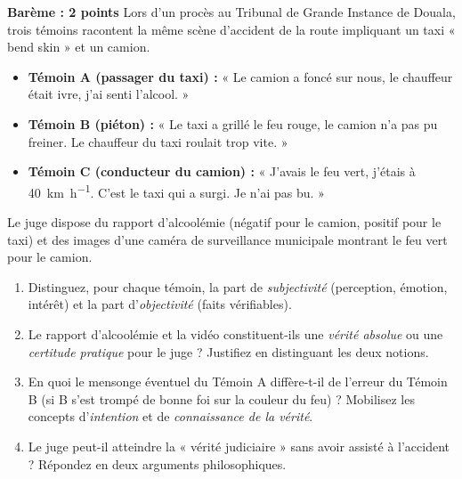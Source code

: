 \documentclass[11pt]{article}
\begin{document}
\begin{exercice}
\textbf{Barème : 2 points}
Lors d'un procès au Tribunal de Grande Instance de Douala, trois témoins racontent la même scène d'accident de la route impliquant un taxi « bend skin » et un camion.

\begin{itemize}
    \item \textbf{Témoin A (passager du taxi) :} « Le camion a foncé sur nous, le chauffeur était ivre, j'ai senti l'alcool. »
    \item \textbf{Témoin B (piéton) :} « Le taxi a grillé le feu rouge, le camion n'a pas pu freiner. Le chauffeur du taxi roulait trop vite. »
    \item \textbf{Témoin C (conducteur du camion) :} « J'avais le feu vert, j'étais à \SI{40}{\kilo\meter\per\hour}. C'est le taxi qui a surgi. Je n'ai pas bu. »
\end{itemize}
Le juge dispose du rapport d'alcoolémie (négatif pour le camion, positif pour le taxi) et des images d'une caméra de surveillance municipale montrant le feu vert pour le camion.

\begin{enumerate}
    \item Distinguez, pour chaque témoin, la part de \textit{subjectivité} (perception, émotion, intérêt) et la part d'\textit{objectivité} (faits vérifiables).
    \item Le rapport d'alcoolémie et la vidéo constituent-ils une \textit{vérité absolue} ou une \textit{certitude pratique} pour le juge ? Justifiez en distinguant les deux notions.
    \item En quoi le mensonge éventuel du Témoin A diffère-t-il de l'erreur du Témoin B (si B s'est trompé de bonne foi sur la couleur du feu) ? Mobilisez les concepts d'\textit{intention} et de \textit{connaissance de la vérité}.
    \item Le juge peut-il atteindre la « vérité judiciaire » sans avoir assisté à l'accident ? Répondez en deux arguments philosophiques.
\end{enumerate}
\end{exercice}
\end{document}
